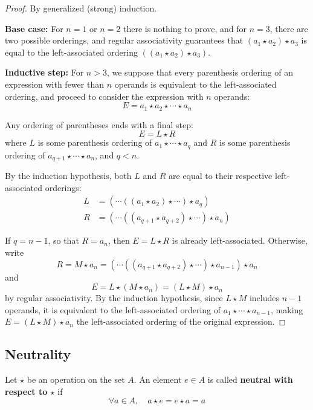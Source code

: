 \begin{proof}
    By generalized (strong) induction.
    
    \textbf{Base case:} For $n = 1$ or $n = 2$ there is nothing to prove, and for $n = 3$, there are two possible orderings, and regular associativity guarantees that $(a_1 \star a_2) \star a_3$ is equal to the left-associated ordering $((a_1 \star a_2) \star a_3)$.
    
    \textbf{Inductive step:} For $n > 3$, we suppose that every parenthesis ordering of an expression with fewer than $n$ operands is equivalent to the left-associated ordering, and proceed to consider the expression with $n$ operands:
    \[
        E = a_1 \star a_2 \star \cdots \star a_n
    \]
    
    Any ordering of parentheses ends with a final step:
    \[
        E = L \star R
    \]
    where $L$ is some parenthesis ordering of $a_1 \star \cdots \star a_q$ and $R$ is some parenthesis ordering of $a_{q+1} \star \cdots \star a_n$, and $q < n$.
    
    By the induction hypothesis, both $L$ and $R$ are equal to their respective left-associated orderings:
    \begin{align*}
        L &= (\cdots((a_1 \star a_2) \star \cdots) \star a_q) \\
        R &= (\cdots((a_{q+1} \star a_{q+2}) \star \cdots) \star a_n)
    \end{align*}
    
    If $q = n-1$, so that $R = a_n$, then $E = L \star R$ is already left-associated. Otherwise, write
    \[
        R = M \star a_n = (\cdots((a_{q+1} \star a_{q+2}) \star \cdots) \star a_{n-1}) \star a_n
    \]
    and
    \[
        E = L \star (M \star a_n) = (L \star M) \star a_n
    \]
    by regular associativity. By the induction hypothesis, since $L \star M$ includes $n-1$ operands, it is equivalent to the left-associated ordering of $a_1 \star \cdots \star a_{n-1}$, making $E = (L \star M) \star a_n$ the left-associated ordering of the original expression.
\end{proof}

\subsection{Neutrality}
\begin{definition}\label{def:neutral-element}
    Let $\star$ be an operation on the set $A$. An element $e \in A$ is called \textbf{neutral with respect to $\star$} if
    \[
        \forall a \in A, \quad a \star e = e \star a = a
    \]
\end{definition}

